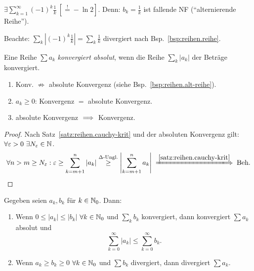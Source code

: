 \documentclass[12pt]{scrreprt}
\begin{document}
\begin{bsp}
  \label{bsp:reihen.alt-reihe}
  $\displaystyle\exists\sum^\infty_{k=1}(-1)^k\frac{1}{k}\ [\stackrel{!}{=} - \ln 2]$. Denn: $\displaystyle b_k = \frac{1}{k}$ ist fallende NF ("`alternierende Reihe"').
  
  Beachte: $\sum_k |(-1)^k\frac{1}{k}| = \sum_k\frac{1}{k}$ divergiert nach Bsp.~\ref{bsp:reihen.reihe}.
\end{bsp}

\begin{dfn}
  \label{dfn:reihen.abs-konv}
  Eine Reihe $\sum a_k$ \emph{konvergiert absolut}, wenn die Reihe $\sum_k |a_k|$ der Beträge konvergiert.
\end{dfn}

\begin{bem}
  \label{bem:reihen.konv-abskonv}
  \begin{enumerate}%
  \item Konv. $\nRightarrow$ absolute Konvergenz (siehe Bsp.~\ref{bsp:reihen.alt-reihe}).%
  \item $a_k \geq 0$: Konvergenz $=$ absolute Konvergenz.
  \item absolute Konvergenz $\implies$ Konvergenz.
  \end{enumerate}
\end{bem}

\begin{proof} Nach Satz~\ref{satz:reihen.cauchy-krit} und der absoluten Konvergenz gilt: $\forall\varepsilon > 0\ \exists N_\varepsilon\in\mathbb{N}$.
\[\forall n>m\geq N_\ep: \ep\geq\sum^n_{k=m+1}\abs{a_k} \stackrel{\Delta\text{-Ungl.}}{\geq} \abs{\sum^n_{k=m+1}a_k} \folgtwegen{\ref{satz:reihen.cauchy-krit}} \text{Beh.}\]
\end{proof}

\begin{satz}[Majorantenkriterium]
  \label{satz:reihen.maj-krit}
  Gegeben seien $a_k, b_k$ für $k\in\mathbb{N}_0$. Dann:
  \begin{enumerate}%
    \item \label{satz:reihen.maj-krit.a} Wenn $0\leq|a_k|\leq|b_k|$ $\forall k\in\mathbb{N}_0$ und $\sum_k b_k$ konvergiert, dann konvergiert $\sum a_k$ absolut und 
    \[\sum^\infty_{k=0}|a_k|\leq\sum^\infty_{k=0}b_k.\]
    \item \label{satz:reihen.maj-krit.b} Wenn $a_k\geq b_k\geq 0$ $\forall k\in\mathbb{N}_0$ und $\sum b_k$ divergiert, dann divergiert $\sum a_k$.
  \end{enumerate}
\end{satz}
\end{document}
